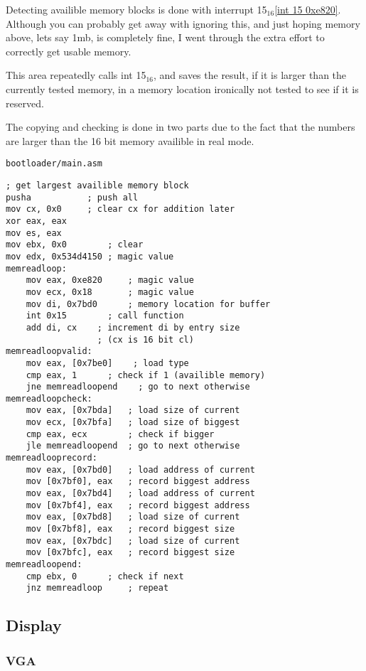 \documentclass{article}
\begin{document}
Detecting availible memory blocks is done with interrupt
15$_{16}$\cite{int 15h}\ref{int 15 0xe820}. Although you can probably get
away with ignoring this, and just hoping memory above,
lets say 1mb, is completely fine, I went through the extra
effort to correctly get usable memory.

This area repeatedly calls int 15$_{16}$, and saves the result,
if it is larger than the currently tested memory, in a memory location
ironically not tested to see if it is reserved.

The copying and checking is done in two parts due to the fact
that the numbers are larger than the 16 bit memory availible in real mode.

\begin{verbatim}
bootloader/main.asm
\end{verbatim}
\begin{verbatim}
; get largest availible memory block
pusha			; push all
mov cx, 0x0		; clear cx for addition later
xor eax, eax
mov es, eax
mov ebx, 0x0		; clear
mov edx, 0x534d4150	; magic value
memreadloop:
	mov eax, 0xe820	    ; magic value
	mov ecx, 0x18	    ; magic value
	mov di, 0x7bd0	    ; memory location for buffer
	int 0x15	    ; call function
	add di, cx    ; increment di by entry size
	              ; (cx is 16 bit cl)
memreadloopvalid:
	mov eax, [0x7be0]    ; load type
	cmp eax, 1	    ; check if 1 (availible memory)
	jne memreadloopend    ; go to next otherwise
memreadloopcheck:
	mov eax, [0x7bda]	; load size of current
	mov ecx, [0x7bfa]	; load size of biggest
	cmp eax, ecx		; check if bigger
	jle memreadloopend	; go to next otherwise
memreadlooprecord:
	mov eax, [0x7bd0]	; load address of current
	mov [0x7bf0], eax	; record biggest address
	mov eax, [0x7bd4]	; load address of current
	mov [0x7bf4], eax	; record biggest address
	mov eax, [0x7bd8]	; load size of current
	mov [0x7bf8], eax	; record biggest size
	mov eax, [0x7bdc]	; load size of current
	mov [0x7bfc], eax	; record biggest size
memreadloopend:
	cmp ebx, 0		; check if next
	jnz memreadloop		; repeat
\end{verbatim}

\subsection{Display}

\subsubsection{VGA}
\end{document}

